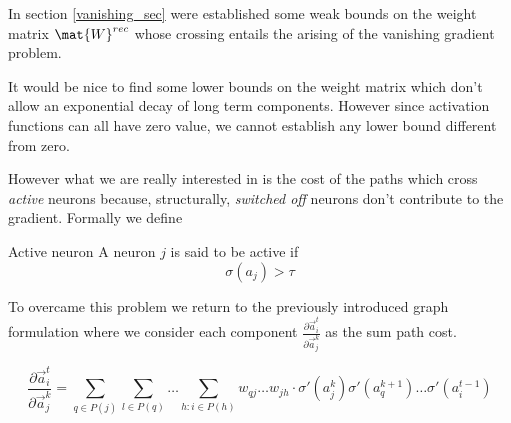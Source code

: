 In section \ref{vanishing_sec} were established some weak bounds on the weight matrix $\mat{W}^{rec}$ whose crossing entails the arising of
the vanishing gradient problem.

It would be nice to find some lower bounds on the weight matrix which don't allow an exponential decay of long term components. However since activation
functions can all have zero value, we cannot establish any lower bound different from zero.

However what we are really interested in is the cost of the paths which cross \textit{active} neurons because, structurally, \textit{switched off} neurons don't
contribute to the gradient. Formally we define


\begin{defn}{Active neuron}
A neuron $j$ is said to be active if $$\sigma(a_j)>\tau$$
 
\end{defn}






To overcame this problem we return to the previously introduced graph formulation where we consider each component 
$\frac{\partial \vec{a}_i^t}{\partial \vec{a}_j^k}$ as the sum path cost.



\begin{equation} 
\frac{\partial \vec{a}_i^t}{\partial \vec{a}_j^k} = \sum_{q\in P(j)} \sum_{l \in P(q)} \hdots \sum_{h : i \in P(h)} w_{qj} \hdots w_{jh} \cdot \sigma'(a_j^k)\sigma'(a_q^{k+1}) \hdots \sigma'(a_i^{t-1})
\label{expanded_mem}
\end{equation}